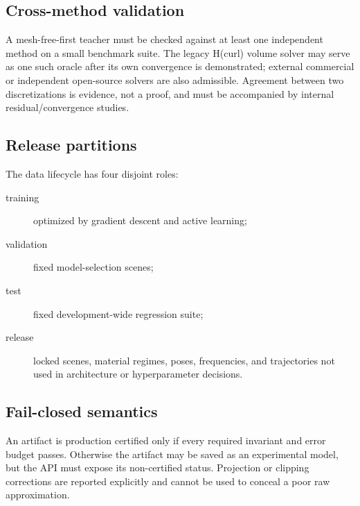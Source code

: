 \subsection{Cross-method validation}

A mesh-free-first teacher must be checked against at least one independent
method on a small benchmark suite. The legacy H(curl) volume solver may serve as
one such oracle after its own convergence is demonstrated; external commercial
or independent open-source solvers are also admissible. Agreement between two
discretizations is evidence, not a proof, and must be accompanied by internal
residual/convergence studies.

\subsection{Release partitions}

The data lifecycle has four disjoint roles:
\begin{description}
\item[training] optimized by gradient descent and active learning;
\item[validation] fixed model-selection scenes;
\item[test] fixed development-wide regression suite;
\item[release] locked scenes, material regimes, poses, frequencies, and
  trajectories not used in architecture or hyperparameter decisions.
\end{description}

\subsection{Fail-closed semantics}

An artifact is production certified only if every required invariant and error
budget passes. Otherwise the artifact may be saved as an experimental model,
but the API must expose its non-certified status. Projection or clipping
corrections are reported explicitly and cannot be used to conceal a poor raw
approximation.
